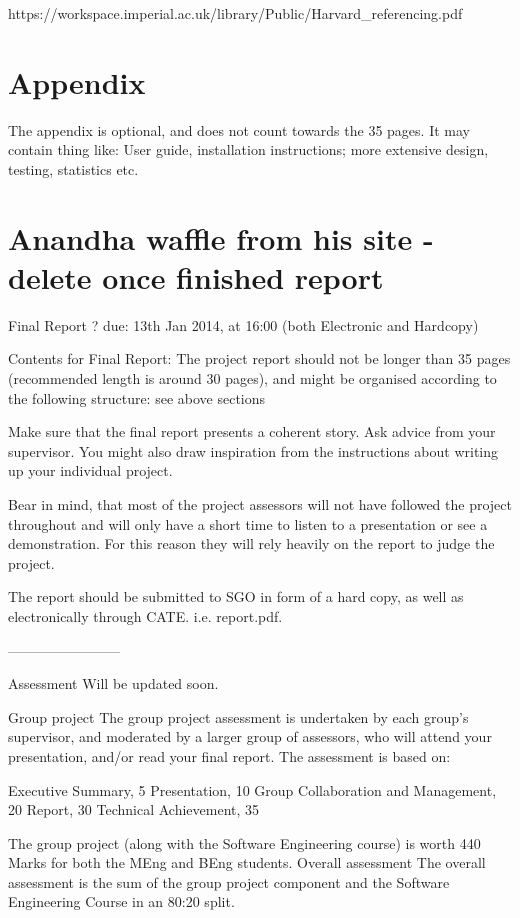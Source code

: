 \documentclass[a4wide, 11pt]{article} \usepackage{a4, fullpage}
\begin{document}

https://workspace.imperial.ac.uk/library/Public/Harvard\_referencing.pdf

\section{Appendix}

The appendix is optional, and does not count towards the 35 pages. It may contain thing like: User guide, installation instructions; more extensive design, testing, statistics etc.

\section{Anandha waffle from his site - delete once finished report}

Final Report ? due: 13th Jan 2014, at 16:00 (both Electronic and Hardcopy)

Contents for Final Report: The project report should not be longer than 35 pages (recommended length is around 30 pages), and might be organised according to the following structure: see above sections

Make sure that the final report presents a coherent story. Ask advice from your supervisor. You might also draw inspiration from the instructions about writing up your individual project.

Bear in mind, that most of the project assessors will not have followed the project throughout and will only have a short time to listen to a presentation or see a demonstration. For this reason they will rely heavily on the report to judge the project.

The report should be submitted to SGO in form of a hard copy, as well as electronically through CATE. i.e. report.pdf. 

------------------------

Assessment
Will be updated soon.

Group project
The group project assessment is undertaken by each group's supervisor, and moderated by a larger group of assessors, who will attend your presentation, and/or read your final report. The assessment is based on:

    Executive Summary, 5
    Presentation, 10
    Group Collaboration and Management, 20
    Report, 30
    Technical Achievement, 35

The group project (along with the Software Engineering course) is worth 440 Marks for both the MEng and BEng students.
Overall assessment
The overall assessment is the sum of the group project component and the Software Engineering Course in an 80:20 split. 
\end{document}
